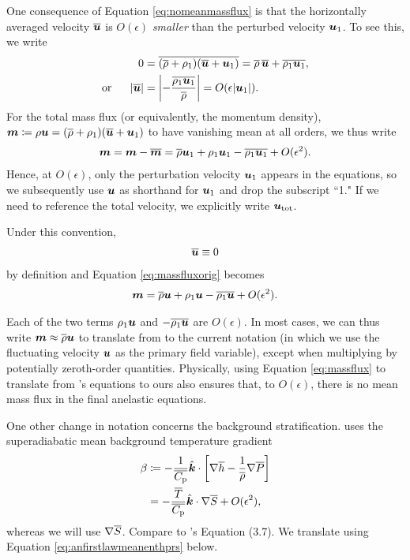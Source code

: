 \documentclass[12pt]{article}
\newcommand{\veck}{\hat{\bm{k}}}
\newcommand{\uover}{{\overline{\vecu}}}
\newcommand{\uone}{{\vecu}_1}
\newcommand{\utot}{{\vecu}_{\rm tot}}
\begin{document}
	One consequence of Equation \eqref{eq:nomeanmassflux} is that the horizontally averaged velocity $\uover$ is $O(\epsilon)$ \textit{smaller} than the perturbed velocity $\uone$. To see this, we write
	\begin{align}\label{eq:smallumean}
		0 &= \overline{(\rhoover+\rhoone)(\uover+\uone)} = \rhoover\,\uover + \overline{\rhoone\uone},\nonumber\\
		\orr |\uover| &= \left|-\frac{\overline{\rhoone\uone}}{\rhoover}\right| = O(\epsilon|\uone|).
	\end{align}
	For the total mass flux (or equivalently, the momentum density), $\bm{m}\define \rho\vecu=(\rhoover+\rhoone)(\uover+\uone)$ to have vanishing mean at all orders, we thus write
		\begin{align}\label{eq:massfluxorig}
		\bm{m} = \bm{m}-\overline{\bm{m}}=\rhoover\uone + \rhoone\uone - \overline{\rhoone\uone} + O(\epsilon^2).
	\end{align}
	Hence, at $O(\epsilon)$, only the perturbation velocity $\uone$ appears in the equations, so we subsequently use $\bm{u}$ as shorthand for $\uone$ and drop the subscript ``1." 	If we need to reference the total velocity, we explicitly write $\utot$. 
	
	Under this convention,
\begin{align}\label{eq:nomeanu}
	\uover\equiv0
\end{align}
	by definition and Equation \eqref{eq:massfluxorig} becomes
	\begin{align}\label{eq:massflux}
		\bm{m} = \overline{\rho}\bm{u} + \rho_1\bm{u} - \overline{\rho_1\bm{u}} + O(\epsilon^2).
	\end{align}
	
	Each of the two terms $\rho_1\bm{u}$ and $-\overline{\rho_1\bm{u}}$ are $O(\epsilon)$. In most cases, we can thus write $\bm{m} \approx \overline{\rho} \bm{u}$ to translate from \citet{Gough1969} to the current notation (in which we use the fluctuating velocity $\bm{u}$ as the primary field variable), except when multiplying by potentially zeroth-order quantities. Physically, using Equation \eqref{eq:massflux} to translate from \citet{Gough1969}'s equations to ours also ensures that, to $O(\epsilon)$, there is no mean mass flux in the final anelastic equations. 
	
	 One other change in notation concerns the background stratification. \citet{Gough1969} uses the superadiabatic mean background temperature gradient
	\begin{align}\label{eq:superad}
		\beta &\define -\frac{1}{\cpover}\veck\cdot\left[\nabla\overline{h}-\frac{1}{\rhoover}\nabla\prsover\right]\nonumber\\
		&=-\frac{\tmpover}{\cpover}\veck\dotgrad\entrover + O(\epsilon^2),
	\end{align}
	whereas we will use $\nabla \overline{S}$. Compare to \citet{Gough1969}'s Equation (3.7). We translate using Equation \eqref{eq:anfirstlawmeanenthprs} below. 
	
\end{document}
